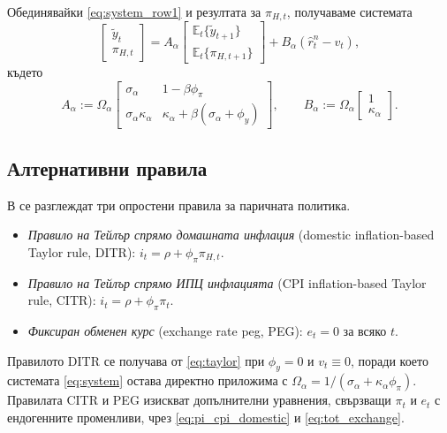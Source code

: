 Обединявайки \eqref{eq:system_row1} и резултата за $\pi_{H,t}$, получаваме системата
\begin{equation}
\begin{bmatrix} \tilde{y}_t \\ \pi_{H,t} \end{bmatrix}
= A_\alpha
\begin{bmatrix} \mathbb{E}_t\{\tilde{y}_{t+1}\} \\ \mathbb{E}_t\{\pi_{H,t+1}\} \end{bmatrix}
+ B_\alpha \left( \hat{r}^n_t - v_t \right),
\label{eq:system}
\end{equation}
където
\begin{equation}
A_\alpha := \Omega_\alpha
\begin{bmatrix}
\sigma_\alpha & 1 - \beta\phi_\pi \\
\sigma_\alpha \kappa_\alpha & \kappa_\alpha + \beta(\sigma_\alpha + \phi_y)
\end{bmatrix},
\qquad
B_\alpha := \Omega_\alpha \begin{bmatrix} 1 \\ \kappa_\alpha \end{bmatrix}.
\label{eq:system_matrices}
\end{equation}

\subsection{Алтернативни правила}

В \textcite[с.~173]{Gali2008} се разглеждат три опростени правила за паричната политика.

\begin{itemize}
\item \emph{Правило на Тейлър спрямо домашната инфлация} (domestic inflation-based Taylor rule, DITR):
$i_t = \rho + \phi_\pi \pi_{H,t}$.
\item \emph{Правило на Тейлър спрямо ИПЦ инфлацията} (CPI inflation-based Taylor rule, CITR):
$i_t = \rho + \phi_\pi \pi_t$.
\item \emph{Фиксиран обменен курс} (exchange rate peg, PEG): $e_t = 0$ за всяко $t$.
\end{itemize}

Правилото DITR се получава от \eqref{eq:taylor} при $\phi_y = 0$ и $v_t \equiv 0$, поради което системата \eqref{eq:system} остава директно приложима с $\Omega_\alpha = 1/(\sigma_\alpha + \kappa_\alpha\phi_\pi)$. Правилата CITR и PEG изискват допълнителни уравнения, свързващи $\pi_t$ и $e_t$ с ендогенните променливи, чрез \eqref{eq:pi_cpi_domestic} и \eqref{eq:tot_exchange}.


